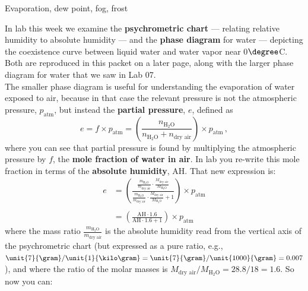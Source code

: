 \documentclass[12pt]{article}
\begin{document}
\begin{center}
{\Large Evaporation, dew point, fog, frost}
\end{center}

\noindent In lab this week we examine the {\bf psychrometric chart} --- relating relative humidity to absolute humidity --- and the {\bf phase diagram} for water --- depicting the coexistence curve between liquid water and water vapor near 0$\degree$C. Both are reproduced in this packet on a later page, along with the larger phase diagram for water that we saw in Lab 07.  \\[-6pt]

\noindent The smaller phase diagram is useful for understanding the evaporation of water exposed to air, because in that case the relevant pressure is not the atmospheric pressure, $p_\text{atm}$, but instead the {\bf partial pressure}, $e$, defined as
	\begin{equation*}
	e = f  \times p_\text{atm} = \left( \frac{n_{\text{H}_2 \text{O}}}{n_{\text{H}_2 \text{O}} + n_\text{dry air}} \right) \times p_\text{atm}\,,
	\end{equation*}
where you can see that partial pressure is found by multiplying the atmospheric pressure by $f$, the {\bf mole fraction of water in air}.  In lab you re-write this mole fraction in terms of the {\bf absolute humidity}, AH.  That new expression is:
	\begin{equation*}
	\begin{split}
	e &= \left( \frac{ 
	\frac{m_{\text{H}_2 \text{O}}}{m_\text{dry air}}  \cdot  \frac{M_\text{dry air}}{M_{\text{H}_2 \text{O}}} 
	}
	{ \frac{m_{\text{H}_2 \text{O}}}{m_\text{dry air}}  \cdot \frac{M_\text{dry air}}{M_{\text{H}_2 \text{O}}}  + 1 } \right) \times p_\text{atm} \\
	& \\
	& =  
	\left(
	\frac{ \text{AH} \cdot 1.6}{ \text{AH} \cdot 1.6 + 1} 
	\right) \times p_\text{atm}
	\end{split}
	\end{equation*}
where the mass ratio  $\frac{m_{\text{H}_2 \text{O}}}{m_\text{dry air}}$  is the absolute humidity read from the vertical axis of the psychrometric chart (but expressed as a pure ratio, e.g., $\unit{7}{\gram} / \unit{1}{\kilo\gram} = \unit{7}{\gram} / \unit{1000}{\gram} = 0.007$), and where the ratio of the molar masses is $M_\text{dry air} / M_{\text{H}_2 \text{O}}  =  28.8/18 = 1.6$.  So now you can:
\end{document}
